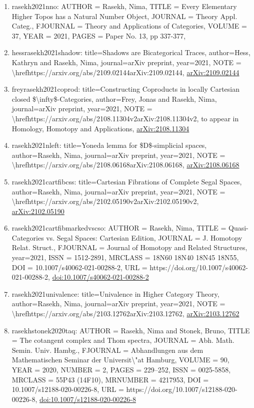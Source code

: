 \documentclass[11pt]{article}
\begin{document}
\begin{enumerate}[leftmargin=*]
  \item rasekh2021nno: AUTHOR = Rasekh, Nima, TITLE = Every Elementary Higher Topos has a Natural Number Object, JOURNAL = Theory Appl. Categ., FJOURNAL = Theory and Applications of Categories, VOLUME = 37, YEAR = 2021, PAGES = Paper No. 13, pp 337-377,
  \item hessrasekh2021shadow: title=Shadows are Bicategorical Traces, author=Hess, Kathryn and Rasekh, Nima, journal=arXiv preprint, year=2021, NOTE = \textbackslash{}hrefhttps://arxiv.org/abs/2109.02144arXiv:2109.02144, \href{https://arxiv.org/abs/2109.02144}{arXiv:2109.02144}
  \item freyrasekh2021coprod: title=Constructing Coproducts in locally Cartesian closed \$\textbackslash{}infty\$-Categories, author=Frey, Jonas and Rasekh, Nima, journal=arXiv preprint, year=2021, NOTE = \textbackslash{}hrefhttps://arxiv.org/abs/2108.11304v2arXiv:2108.11304v2, to appear in Homology, Homotopy and Applications, \href{https://arxiv.org/abs/2108.11304}{arXiv:2108.11304}
  \item rasekh2021nleft: title=Yoneda lemma for \$D\$-simplicial spaces, author=Rasekh, Nima, journal=arXiv preprint, year=2021, NOTE = \textbackslash{}hrefhttps://arxiv.org/abs/2108.06168arXiv:2108.06168, \href{https://arxiv.org/abs/2108.06168}{arXiv:2108.06168}
  \item rasekh2021cartfibcss: title=Cartesian Fibrations of Complete Segal Spaces, author=Rasekh, Nima, journal=arXiv preprint, year=2021, NOTE = \textbackslash{}hrefhttps://arxiv.org/abs/2102.05190v2arXiv:2102.05190v2, \href{https://arxiv.org/abs/2102.05190}{arXiv:2102.05190}
  \item rasekh2021cartfibmarkedvscso: AUTHOR = Rasekh, Nima, TITLE = Quasi-Categories vs. Segal Spaces: Cartesian Edition, JOURNAL = J. Homotopy Relat. Struct., FJOURNAL = Journal of Homotopy and Related Structures, year=2021, ISSN = 1512-2891, MRCLASS = 18N60 18N40 18N45 18N55, DOI = 10.1007/s40062-021-00288-2, URL = https://doi.org/10.1007/s40062-021-00288-2, \href{https://doi.org/10.1007/s40062-021-00288-2}{doi:10.1007/s40062-021-00288-2}
  \item rasekh2021univalence: title=Univalence in Higher Category Theory, author=Rasekh, Nima, journal=arXiv preprint, year=2021, NOTE = \textbackslash{}hrefhttps://arxiv.org/abs/2103.12762arXiv:2103.12762, \href{https://arxiv.org/abs/2103.12762}{arXiv:2103.12762}
  \item rasekhstonek2020taq: AUTHOR = Rasekh, Nima and Stonek, Bruno, TITLE = The cotangent complex and Thom spectra, JOURNAL = Abh. Math. Semin. Univ. Hambg., FJOURNAL = Abhandlungen aus dem Mathematischen Seminar der Universit\textbackslash{}"at Hamburg, VOLUME = 90, YEAR = 2020, NUMBER = 2, PAGES = 229--252, ISSN = 0025-5858, MRCLASS = 55P43 (14F10), MRNUMBER = 4217953, DOI = 10.1007/s12188-020-00226-8, URL = https://doi.org/10.1007/s12188-020-00226-8, \href{https://doi.org/10.1007/s12188-020-00226-8}{doi:10.1007/s12188-020-00226-8}

\end{enumerate}
\end{document}
